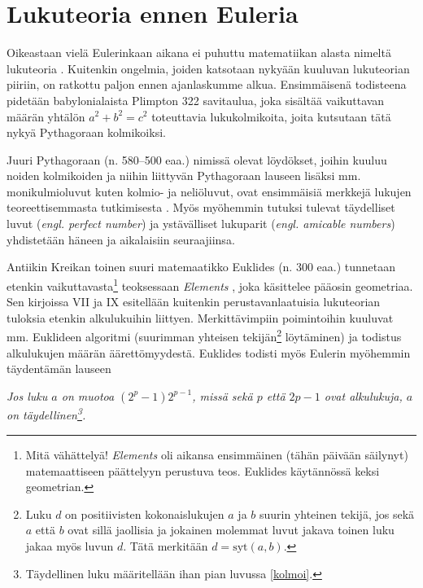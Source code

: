\documentclass[a4paper,11pt]{article}
\begin{document}
\section{Lukuteoria ennen Euleria}
\label{kakkoi}

Oikeastaan vielä Eulerinkaan aikana ei puhuttu matematiikan alasta nimeltä lukuteoria \cite{Karatsuba}. Kuitenkin ongelmia, joiden katsotaan nykyään kuuluvan lukuteorian piiriin, on ratkottu paljon ennen ajanlaskumme alkua. Ensimmäisenä todisteena pidetään babylonialaista Plimpton 322 savitaulua, joka sisältää vaikuttavan määrän yhtälön $a^2+b^2=c^2$ toteuttavia lukukolmikoita, joita kutsutaan tätä nykyä Pythagoraan kolmikoiksi.

Juuri Pythagoraan (n. 580–500 eaa.) nimissä olevat löydökset, joihin kuuluu noiden kolmikoiden ja niihin liittyvän Pythagoraan lauseen lisäksi mm. monikulmioluvut kuten kolmio- ja neliöluvut, ovat ensimmäisiä merkkejä lukujen teoreettisemmasta tutkimisesta \cite{Burton}. Myös myöhemmin tutuksi tulevat täydelliset luvut (\textit{engl. perfect number}) ja ystävälliset lukuparit (\textit{engl. amicable numbers}) yhdistetään häneen ja aikalaisiin seuraajiinsa.

Antiikin Kreikan toinen suuri matemaatikko Euklides (n. 300 eaa.) tunnetaan etenkin vaikuttavasta\footnote{Mitä vähättelyä! \textit{Elements} oli aikansa ensimmäinen (tähän päivään säilynyt) matemaattiseen päättelyyn perustuva teos. Euklides käytännössä keksi geometrian.} teoksessaan \textit{Elements} \cite{Elements}, joka käsittelee pääosin geometriaa. Sen kirjoissa VII ja IX esitellään kuitenkin perustavanlaatuisia lukuteorian tuloksia etenkin alkulukuihin liittyen. Merkittävimpiin poimintoihin kuuluvat mm. Euklideen algoritmi (suurimman yhteisen tekijän\footnote{Luku $d$ on positiivisten kokonaislukujen $a$ ja $b$ suurin yhteinen tekijä, jos sekä $a$ että $b$ ovat sillä jaollisia ja jokainen molemmat luvut jakava toinen luku jakaa myös luvun $d$. Tätä merkitään $d=\text{syt}(a,b)$.} löytäminen) ja todistus alkulukujen määrän äärettömyydestä. Euklides todisti myös Eulerin myöhemmin täydentämän lauseen

\begin{center}
    \textit{Jos luku $a$ on muotoa $(2^p-1)2^{p-1}$, missä sekä $p$ että $2p-1$ ovat alkulukuja, $a$ on täydellinen\footnote{Täydellinen luku määritellään ihan pian luvussa \ref{kolmoi}.}.}
\end{center}
\end{document}
